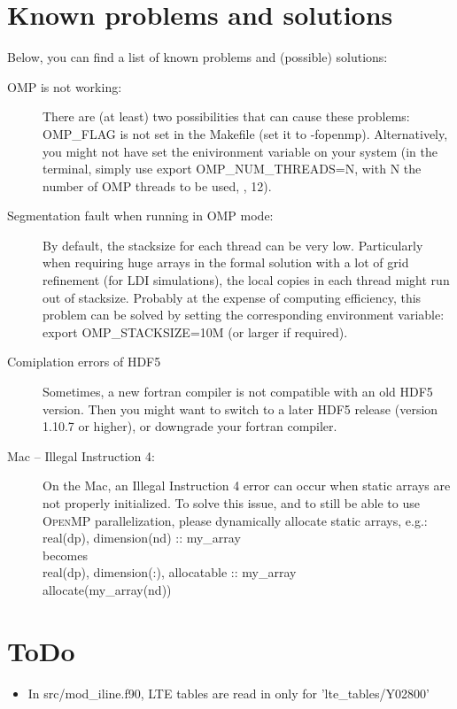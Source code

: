 \documentclass[10pt,a4paper]{article}
\begin{document}
\section{Known problems and solutions}
Below, you can find a list of known problems and (possible) solutions:
\begin{description}
\item[OMP is not working:] There are (at least) two possibilities that can cause
  these problems: OMP\_FLAG is not set in the Makefile (set it to
  -fopenmp). Alternatively, you might not have set the enivironment
  variable on your system (in the terminal, simply use export OMP\_NUM\_THREADS=N, with N the number of OMP threads to be used, \eg, 12).
\item[Segmentation fault when running in OMP mode:] By default, the
  stacksize for each thread can be very low. Particularly when
  requiring huge arrays in the formal solution with a lot of
  grid refinement (\eg for LDI simulations), the local copies in each thread might run out of stacksize. Probably at the expense of computing efficiency, this problem can be solved by setting the corresponding environment variable: export OMP\_STACKSIZE=10M  (or larger if required).
\item[Comiplation errors of HDF5] Sometimes, a new fortran compiler is
  not compatible with an old HDF5 version. Then you might want to
  switch to a later HDF5 release (version 1.10.7 or higher), or
  downgrade your fortran compiler.

\item[Mac -- Illegal Instruction 4:] On the Mac, an Illegal Instruction 4 error can occur when static arrays are not properly
  initialized. To solve this issue, and to still be able to use \textsc{OpenMP} parallelization, please dynamically allocate static arrays, e.g.:\\
  real(dp), dimension(nd) :: my\_array \\
  becomes \\
  real(dp), dimension(:), allocatable :: my\_array \\
  allocate(my\_array(nd))
\end{description}


\section{ToDo}
\begin{itemize}
\item In src/mod\_iline.f90, LTE tables are read in only for 'lte\_tables/Y02800'
\end{itemize}
\end{document}
